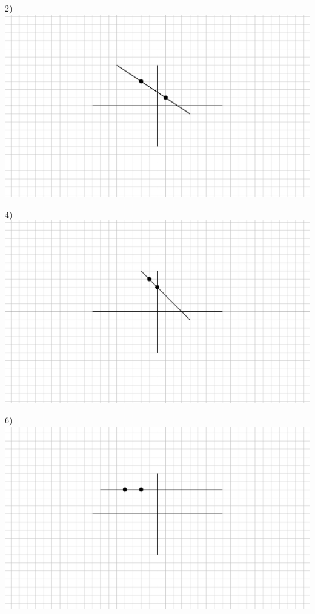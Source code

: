 \documentclass[11pt]{book}
\theoremstyle{definition}  %
\begin{document}
\begin{multicols}{2}
  2)\\
	\includegraphics[scale=.8,bb = 115 65 310 190, clip=true]{II_1_3cp-7.eps}
  
  
  
  4)\\
	\includegraphics[scale=.8,bb = 115 65 310 190, clip=true]{II_1_3cp-9.eps}
  
  6)\\  
  \includegraphics[scale=.8,bb = 115 65 310 190, clip=true]{II_1_3cp-10.eps}
\end{multicols}
\end{document}
